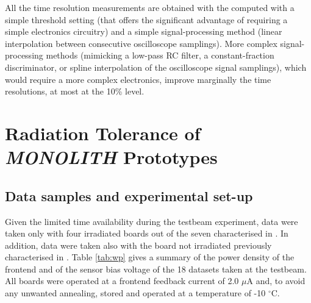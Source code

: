 		All the time resolution measurements are obtained with the \toa computed with a simple threshold setting (that offers the significant advantage of requiring a simple electronics circuitry) and a simple signal-processing method (linear interpolation between consecutive oscilloscope samplings).
		More complex signal-processing methods (mimicking a low-pass RC filter, a constant-fraction discriminator, or spline interpolation of the oscilloscope signal samplings), which would require a more complex electronics, improve marginally the time resolutions, at most at the 10\% level.















	\clearpage
	\section{Radiation Tolerance of \textit{MONOLITH} Prototypes}

		\subsection{Data samples and experimental set-up}\label{sec:Samples&Setup}
		Given the limited time availability during the testbeam experiment, data were taken only with four irradiated boards out of the seven characterised in \cite{milanesio2023radiation}. 
		In addition, data were taken also with the board not irradiated previously characterised in \cite{Zambito_2023}.
		Table \ref{tab:wp} gives a summary of the power density of the frontend and of the sensor bias voltage of the 18 datasets taken at the testbeam.
		All boards were operated at a frontend feedback current of 2.0 $\mu$A and, to avoid any unwanted annealing,  stored and operated at a temperature of -10 $^\circ$C. 

